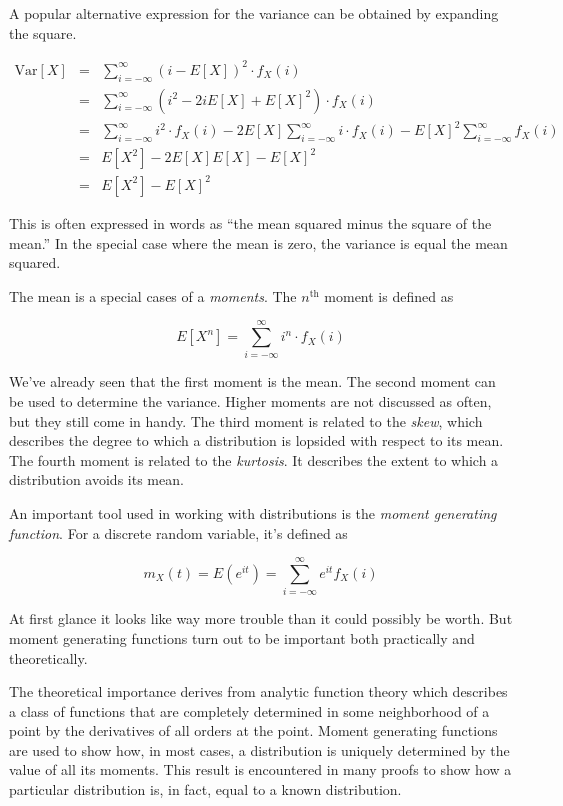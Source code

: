 \documentclass[]{article}
\begin{document}
A popular alternative expression for the variance can be
obtained by expanding the square.

\begin{eqnarray}
\mbox{Var}[X] & = & \sum_{i=-\infty}^{\infty} (i - E[X])^2 \cdot f_X(i) \nonumber \\
   & = & \sum_{i=-\infty}^{\infty} (i^2 - 2iE[X] + E[X]^2) \cdot f_X(i) \nonumber \\
   & = & \sum_{i=-\infty}^{\infty} i^2 \cdot f_X(i) 
       - 2E[X] \sum_{i=-\infty}^{\infty} i \cdot f_X(i)
       - E[X]^2 \sum_{i=-\infty}^{\infty} f_X(i) \nonumber \\
   & = & E[X^2] - 2E[X] E[X] - E[X]^2 \nonumber \\
   & = & E[X^2] - E[X]^2   \label{discrete_var2}
\end{eqnarray}

This is often expressed in words as ``the mean squared minus the
square of the mean.''  In the special case where the mean is zero,
the variance is equal the mean squared.

The mean is a special cases of a \emph{moments}.
The $n^{\mbox{th}}$ moment is defined as

$$
E[X^n] = \sum_{i = -\infty}^{\infty} i^n \cdot f_X(i)
$$

We've already seen that the first moment is the mean.
The second moment can be used to determine the variance.
Higher moments are not
discussed as often, but they still come in handy.  The
third moment is related to the \emph{skew}, which describes
the degree
to which a distribution is lopsided with respect to its
mean.  The fourth moment is related to the \emph{kurtosis}.  It
describes the extent to which a distribution avoids its mean.

An important tool used in working with distributions is the
\emph{moment generating function}.  For a discrete random
variable, it's defined as

\begin{equation} \label{discrete_mgf}
m_X(t) = E(e^{it}) = \sum_{i=-\infty}^{\infty} e^{it} f_X(i)
\end{equation}

At first glance it looks like way more trouble than it could
possibly be worth.  But moment generating functions turn out
to be important both practically and theoretically.

The theoretical importance derives from analytic function
theory which describes a class of functions that are completely
determined in some neighborhood of a point by the derivatives 
of all orders at the point.  Moment generating functions are
used to show how, in most cases, a distribution is uniquely
determined by the value of all its moments.  This result
is encountered in many proofs to show how a particular
distribution is, in fact, equal to a known distribution.
\end{document}
